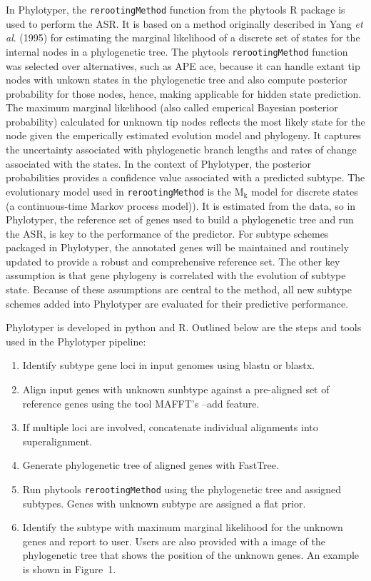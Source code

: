 \documentclass{bioinfo}
\begin{document}
In Phylotyper, the \texttt{rerootingMethod} function from the phytools R package is used to perform the ASR.
It is based on a method originally described in Yang \emph{et al}. (1995) for estimating the marginal likelihood of a discrete set of states for the internal nodes in a phylogenetic tree.
The phytools \texttt{rerootingMethod} function was selected over alternatives, such as APE ace, because it can handle extant tip nodes with unkown states in the phylogenetic tree and also compute posterior probability for those nodes, hence, making applicable for hidden state prediction.
The maximum marginal likelihood (also called emperical Bayesian posterior probability) calculated for unknown tip nodes reflects the most likely state for the node given the emperically estimated evolution model and phylogeny.
It captures the uncertainty associated with phylogenetic branch lengths and rates of change associated with the states.
In the context of Phylotyper, the posterior probabilities provides a confidence value associated with a predicted subtype.
The evolutionary model used in \texttt{rerootingMethod} is the $\text{M}_{\text{k}}$ model for discrete states (a continuous-time Markov process model)).  
It is estimated from the data, so in Phylotyper, the reference set of genes used to build a phylogenetic tree and run the ASR, is key to the performance of the predictor.
For subtype schemes packaged in Phylotyper, the annotated genes will be maintained and routinely updated to provide a robust and comprehensive reference set.
The other key assumption is that gene phylogeny is correlated with the evolution of subtype state.
Because of these assumptions are central to the method, all new subtype schemes added into Phylotyper are evaluated for their predictive performance.

Phylotyper is developed in python and R. 
Outlined below are the steps and tools used in the Phylotyper pipeline:

\begin{enumerate}
\item Identify subtype gene loci in input genomes using blastn or blastx.
\item Align input genes with unknown sunbtype against a pre-aligned set of reference genes using the tool MAFFT's --add feature.
\item If multiple loci are involved, concatenate individual alignments into superalignment.
\item Generate phylogenetic tree of aligned genes with FastTree.
\item Run phytools \texttt{rerootingMethod} using the phylogenetic tree and assigned subtypes. 
Genes with unknown subtype are assigned a flat prior.
\item Identify the subtype with maximum marginal likelihood for the unknown genes and report to user.
Users are also provided with a image of the phylogenetic tree that shows the position of the unknown genes. 
An example is shown in Figure~1\vphantom{\ref{fig:01}}.
\end{enumerate}
\end{document}
